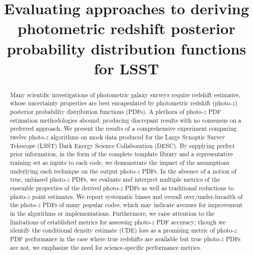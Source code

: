 \documentclass[\docopts]{\docclass}
\begin{document}
\linenumbers

\title{Evaluating approaches to deriving photometric redshift posterior probability distribution functions for \textsc{LSST}}

\maketitlepre

\begin{abstract}

Many scientific investigations of photometric galaxy surveys require redshift estimates, whose uncertainty properties are best encapsulated by photometric redshift (photo-$z$) posterior probability distribution functions (PDFs).
A plethora of photo-$z$ PDF estimation methodologies abound, producing discrepant results with no consensus on a preferred approach.
We present the results of a comprehensive experiment comparing twelve photo-$z$ algorithms on mock data produced for the Large Synoptic Survey Telescope (\textsc{LSST}) Dark Energy Science Collaboration (\textsc{DESC}).
By supplying perfect prior information, in the form of the complete template library and a representative training set as inputs to each code, we demonstrate the impact of the assumptions underlying each technique on the output photo-$z$ PDFs.
In the absence of a notion of true, unbiased photo-$z$ PDFs, we evaluate and interpret multiple metrics of the ensemble properties of the derived photo-$z$ PDFs as well as traditional reductions to photo-$z$ point estimates.
We report systematic biases and overall over/under-breadth of the photo-$z$ PDFs of many popular codes, which may indicate avenues for improvement in the algorithms or implementations.
Furthermore, we raise attention to the limitations of established metrics for assessing photo-$z$ PDF accuracy; though we identify the conditional density estimate (CDE) loss as a promising metric of photo-$z$ PDF performance in the case where true redshifts are available but true photo-$z$ PDFs are not, we emphasize the need for science-specific performance metrics.

\end{abstract}


\maketitlepost





\end{document}
